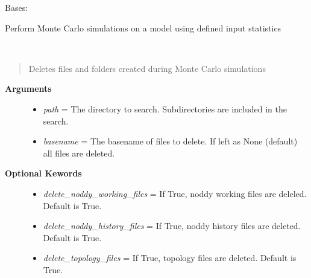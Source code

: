 \documentclass[a4paper,10pt,english]{sphinxmanual}
\begin{document}
\begin{fulllineitems}
\label{pynoddy:pynoddy.experiment.MonteCarlo.MonteCarlo}
Bases: {\hyperref[pynoddy:pynoddy.experiment.Experiment]{\emph{}}}

Perform Monte Carlo simulations on a model using defined input statistics

\begin{fulllineitems}
\label{pynoddy:pynoddy.experiment.MonteCarlo.MonteCarlo.clean}~\begin{quote}

Deletes files and folders created during Monte Carlo simulations
\end{quote}
\begin{description}
\item[{\textbf{Arguments}}] \leavevmode\begin{itemize}
\item {} 
\emph{path} = The directory to search. Subdirectories are included in the search.

\item {} 
\emph{basename} = The basename of files to delete. If left as None (default) all files are deleted.

\end{itemize}

\item[{\textbf{Optional Kewords}}] \leavevmode\begin{itemize}
\item {} 
\emph{delete\_noddy\_working\_files} = If True, noddy working files are deleled. Default is True.

\item {} 
\emph{delete\_noddy\_history\_files} = If True, noddy history files are deleted. Default is True.

\item {} 
\emph{delete\_topology\_files} = If True, topology files are deleted. Default is True.

\end{itemize}

\end{description}


\end{fulllineitems}
\end{fulllineitems}
\end{document}

